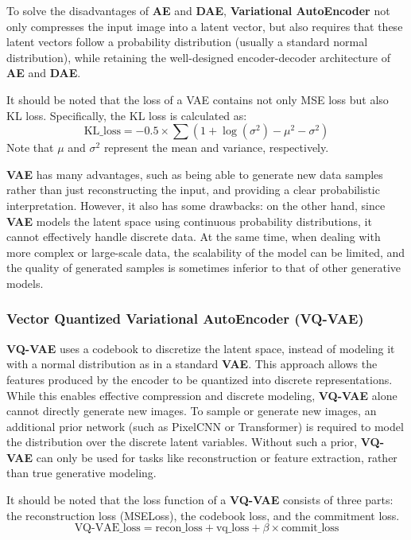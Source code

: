 \documentclass{article}
\begin{document}
To solve the disadvantages of \textbf{AE} and \textbf{DAE}, \textbf{Variational AutoEncoder} not only 
compresses the input image into a latent vector, but also requires that these latent vectors follow a 
probability distribution (usually a standard normal distribution), while retaining the well-designed 
encoder-decoder architecture of \textbf{AE} and \textbf{DAE}.

It should be noted that the loss of a VAE contains not only MSE loss but also KL loss. Specifically, the KL 
loss is calculated as:
\begin{equation}
\text{KL\_loss} = -0.5 \times \sum \left(1 + \log(\sigma^2) - \mu^2 - \sigma^2\right)
\end{equation}
Note that $\mu$ and $\sigma^2$ represent the mean and variance, respectively.


\textbf{VAE} has many advantages, such as being able to generate new data samples rather than just 
reconstructing the input, and providing a clear probabilistic interpretation. However, it also has some 
drawbacks: on the other hand, since \textbf{VAE} models the latent space using continuous probability 
distributions, it cannot effectively handle discrete data. At the same time, when dealing with more complex 
or large-scale data, the scalability of the model can be limited, and the quality of generated samples is 
sometimes inferior to that of other generative models.

\subsubsection{Vector Quantized Variational AutoEncoder (VQ-VAE)}

\textbf{VQ-VAE} uses a codebook to discretize the latent space, instead of modeling it with a normal 
distribution as in a standard \textbf{VAE}. This approach allows the features produced by the encoder to be 
quantized into discrete representations. While this enables effective compression and discrete modeling, 
\textbf{VQ-VAE} alone cannot directly generate new images. To sample or generate new images, an additional 
prior network (such as PixelCNN or Transformer) is required to model the distribution over the discrete 
latent variables. Without such a prior, \textbf{VQ-VAE} can only be used for tasks like reconstruction or 
feature extraction, rather than true generative modeling.

It should be noted that the loss function of a \textbf{VQ-VAE} consists of three parts: the reconstruction 
loss (MSELoss), the codebook loss, and the commitment loss.
\begin{equation}
\text{VQ-VAE\_loss} = \text{recon\_loss} + \text{vq\_loss} + \beta \times \text{commit\_loss}
\end{equation}
\end{document}
